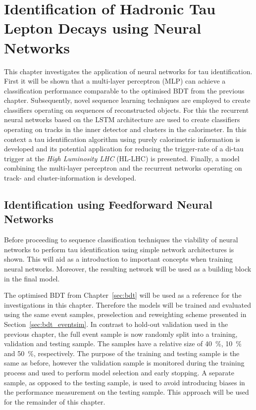 \chapter{Identification of Hadronic Tau Lepton Decays using Neural Networks}
\label{sec:rnn}

This chapter investigates the application of neural networks for tau
identification. First it will be shown that a multi-layer perceptron (MLP) can
achieve a classification performance comparable to the optimised BDT from the
previous chapter. Subsequently, novel sequence learning techniques are employed
to create classifiers operating on sequences of reconstructed objects. For this
the recurrent neural networks based on the LSTM architecture are used to create
classifiers operating on tracks in the inner detector and clusters in the
calorimeter. In this context a tau identification algorithm using purely
calorimetric information is developed and its potential application for reducing
the trigger-rate of a di-tau trigger at the \emph{High Luminosity LHC} (HL-LHC)
is presented. Finally, a model combining the multi-layer perceptron and the
recurrent networks operating on track- and cluster-information is developed.

\section{Identification using Feedforward Neural Networks}
\label{sec:ffnn_id}

Before proceeding to sequence classification techniques the viability of neural
networks to perform tau identification using simple network architectures is
shown. This will aid as a introduction to important concepts when training
neural networks. Moreover, the resulting network will be used as a building
block in the final model.

The optimised BDT from Chapter~\ref{sec:bdt} will be used as a reference for the
investigations in this chapter. Therefore the models will be trained and
evaluated using the same event samples, preselection and reweighting scheme
presented in Section~\ref{sec:bdt_eventsim}. In contrast to hold-out validation
used in the previous chapter, the full event sample is now randomly split into a
training, validation and testing sample. The samples have a relative size of
\SI{40}{\percent}, \SI{10}{\percent} and \SI{50}{\percent}, respectively. The
purpose of the training and testing sample is the same as before, however the
validation sample is monitored during the training process and used to perform
model selection and early stopping. A separate sample, as opposed to the testing
sample, is used to avoid introducing biases in the performance measurement on
the testing sample. This approach will be used for the remainder of this
chapter.

